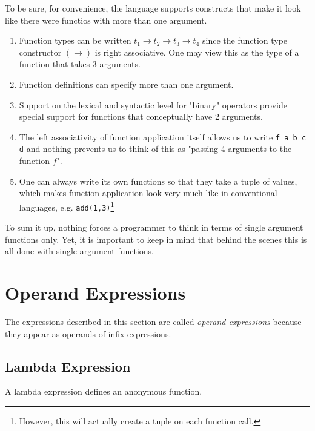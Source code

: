 To be sure, for convenience, the language supports constructs that make it look like there were functios with more than one argument.
\begin{enumerate}
\item Function types can be written $t_1 \rightarrow{} t_2 \rightarrow{} t_3 \rightarrow{} t_4$ since the function type constructor $(\rightarrow)$ is right associative. One may view this as the type of a function that takes 3 arguments.
\item Function definitions can specify more than one argument.
\item Support on the lexical and syntactic level for "binary" operators provide special support for functions that conceptually have 2 arguments.
\item The left associativity of function application itself allows us to write \texttt{f a b c d} and nothing prevents us to think of this as "passing 4 arguments to the function $f$".
\item One can always write its own functions so that they take a tuple of values, which makes function application look very much like in conventional languages, e.g. \texttt{add(1,3)}\footnote{However, this will actually create a tuple on each function call.}
\end{enumerate}

To sum it up, nothing forces a \frege{} programmer to think in terms of single argument functions only.
Yet, it is important to keep in mind that behind the scenes this is all done with single argument functions.


\section{Operand Expressions} \label{topex}

The expressions described in this section are called \emph{operand expressions} because they appear as operands of \hyperref[binex]{infix expressions}.

\subsection{Lambda Expression} \label{lambda}

A lambda expression defines an anonymous function.

